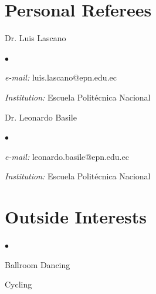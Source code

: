 \documentclass[margin,line]{res}
\newenvironment{list1}{
  \begin{list}{\ding{113}}{%
      \setlength{\itemsep}{0in}
      \setlength{\parsep}{0in} \setlength{\parskip}{0in}
      \setlength{\topsep}{0in} \setlength{\partopsep}{0in} 
      \setlength{\leftmargin}{0.17in}}}{\end{list}}
\newenvironment{list2}{
  \begin{list}{$\bullet$}{%
      \setlength{\itemsep}{0in}
      \setlength{\parsep}{0in} \setlength{\parskip}{0in}
      \setlength{\topsep}{0in} \setlength{\partopsep}{0in} 
      \setlength{\leftmargin}{0.2in}}}{\end{list}}
\begin{document}
\begin{resume}
\section{\sc Personal Referees}
 \begin{list1}
  \item[] Dr. Luis Lascano
  \begin{list2}
   \item {\it e-mail:} luis.lascano@epn.edu.ec
   \item {\it Institution:} Escuela Politécnica Nacional
  \end{list2}
 \end{list1}
 \begin{list1}
  \item[] Dr. Leonardo Basile
  \begin{list2}
   \item {\it e-mail:} leonardo.basile@epn.edu.ec
   \item {\it Institution:} Escuela Politécnica Nacional
  \end{list2}
 \end{list1}


\section{\sc Outside Interests}
 \begin{list2}
  \item Ballroom Dancing
  \item Cycling
 \end{list2}

\end{resume}
\end{document}

